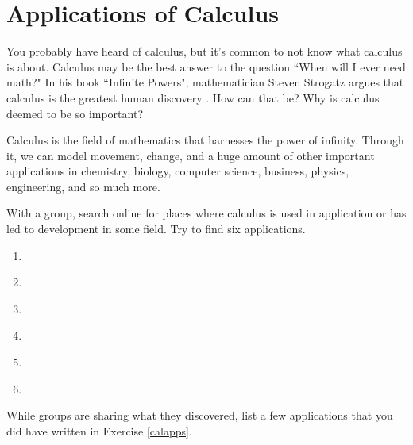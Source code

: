 
\section{Applications of Calculus}

You probably have heard of calculus, but it's common to not know what calculus is about. Calculus may be the best answer to the question ``When will I ever need math?" In his book ``Infinite Powers", mathematician Steven Strogatz argues that calculus is the greatest human discovery \cite{infinite_powers}. How can that be? Why is calculus deemed to be so important?

\noindent Calculus is the field of mathematics that harnesses the power of infinity. Through it, we can model movement, change, and a huge amount of other important applications in chemistry, biology, computer science, business, physics, engineering, and so much more.

\begin{exercise}\label{calapps}
With a group, search online for places where calculus is used in application or has led to development in some field. Try to find six applications.
\end{exercise}

\begin{enumerate}
    \item \hspace{1.5in} \\
    \item \hspace{1.5in}  \\
    \item \hspace{1.5in} \\ 
    \item \hspace{1.5in} \\ 
    \item \hspace{1.5in} \\ 
    \item \hspace{1.5in}
\end{enumerate}

\begin{exercise}
While groups are sharing what they discovered, list a few applications that you did have written in Exercise \ref{calapps}.
\end{exercise}

